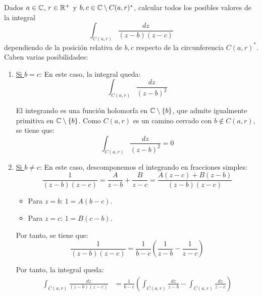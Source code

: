 \begin{ejercicio}
    Dados $a \in \mathbb{C}$, $r \in \mathbb{R}^+$ y $b,c \in \mathbb{C}\setminus C(a,r)^\ast$, calcular todos los posibles valores de la integral
    \[
        \int_{C(a,r)} \frac{dz}{(z-b)(z-c)}
    \]
    dependiendo de la posición relativa de $b,c$ respecto de la circunferencia $C(a,r)^\ast$.\\

    Caben varias posibilidades:
    \begin{enumerate}
        \item \ul{Si $b=c$}: En este caso, la integral queda:
        \begin{equation*}
            \int_{C(a,r)} \frac{dz}{(z-b)^2}
        \end{equation*}

        El integrando es una función holomorfa en $\mathbb{C}\setminus \{b\}$, que admite igualmente primitiva en $\mathbb{C}\setminus \{b\}$. Como $C(a,r)$ es un camino cerrado con $b\notin C(a,r)$, se tiene que:
        \begin{equation*}
            \int_{C(a,r)} \frac{dz}{(z-b)^2} = 0
        \end{equation*}

        \item{\ul{Si $b\neq c$}}: En este caso, descomponemos el integrando en fracciones simples:
        \begin{equation*}
            \dfrac{1}{(z-b)(z-c)} = \dfrac{A}{z-b} + \dfrac{B}{z-c} = \dfrac{A(z-c)+B(z-b)}{(z-b)(z-c)}
        \end{equation*}
        \begin{itemize}
            \item Para $z=b$: $1=A(b-c)$.
            \item Para $z=c$: $1=B(c-b)$.
        \end{itemize}

        Por tanto, se tiene que:
        \begin{equation*}
            \frac{1}{(z-b)(z-c)} = \frac{1}{b-c}\left(\frac{1}{z-b}-\frac{1}{z-c}\right)
        \end{equation*}

        Por tanto, la integral queda:
        \begin{align*}
            \int_{C(a,r)} \frac{dz}{(z-b)(z-c)} &= \frac{1}{b-c}\left(\int_{C(a,r)} \frac{dz}{z-b}-\int_{C(a,r)} \frac{dz}{z-c}\right)
        \end{align*}


\end{enumerate}
\end{ejercicio}

